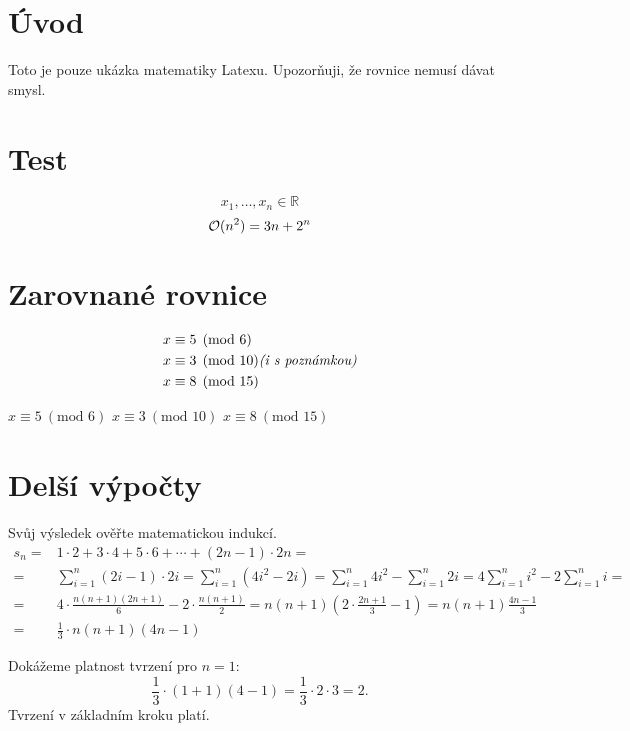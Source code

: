 \documentclass{article}
\begin{document}
\section{Úvod}
Toto je pouze ukázka matematiky Latexu. Upozorňuji, že rovnice nemusí dávat smysl.

\section{Test}
$$
  x_1,\dots, x_n \in\mathbb{R}
$$
$$
  \mathcal{O}(n^2)=3n+2^n
$$

\section{Zarovnané rovnice}
\begin{align*}
x & \equiv 5 \pmod{6} \\
x & \equiv 3 \pmod{10} \text{\textit{(i s poznámkou)}} \\
x & \equiv 8 \pmod{15}
\end{align*}

\begin{center}
$x \equiv 5~(\text{mod } 6)$\linebreak
$x \equiv 3~(\text{mod } 10)$\linebreak
$x \equiv 8~(\text{mod } 15)$
\end{center}


\section{Delší výpočty}
Svůj výsledek ověřte matematickou indukcí.
\begin{equation*}
\begin{split}
s_n = & 1\cdot2 + 3\cdot4 + 5\cdot6 + \cdots + (2n-1) \cdot 2n = \\
 = & \sum\limits_{i=1}^{n} (2i-1)\cdot 2i =
     \sum\limits_{i=1}^{n} (4i^2-2i) =
     \sum\limits_{i=1}^{n} 4i^2 - \sum\limits_{i=1}^{n} 2i =
     4\sum\limits_{i=1}^{n} i^2 - 2\sum\limits_{i=1}^{n} i = \\
 = & 4 \cdot \frac{n(n+1)(2n+1)}{6} - 2 \cdot \frac{n(n+1)}{2} =
     n(n+1) (2 \cdot \frac{2n+1}{3} - 1) =
     n(n+1) \frac{4n-1}{3} \\
 = & \frac{1}{3} \cdot n(n+1)(4n-1)
\end{split}
\end{equation*}

 Dokážeme platnost tvrzení pro $n = 1$:
$$
    \frac{1}{3} \cdot (1+1)(4-1) = \frac{1}{3} \cdot 2 \cdot 3 = 2.
$$
Tvrzení v základním kroku platí.
\end{document}

